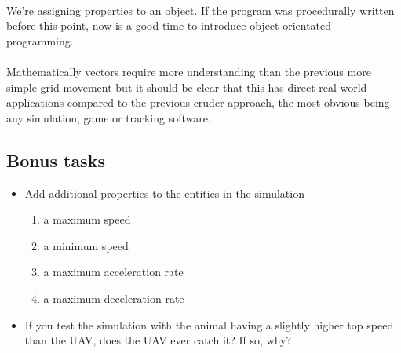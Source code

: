 \documentclass[11pt]{book}
\begin{document}
\paragraph{} We're assigning properties to an object. If the program was
procedurally written before this point, now is a good time to introduce object
orientated programming.

\paragraph{} Mathematically vectors require more understanding than the
previous more simple grid movement but it should be clear that this has direct
real world applications compared to the previous cruder approach, the most
obvious being any simulation, game or tracking software.

\subsection{Bonus tasks}

\begin{itemize}
\item Add additional properties to the entities in the simulation
    \begin{enumerate} 
    \item a maximum speed
    \item a minimum speed
    \item a maximum acceleration rate
    \item a maximum deceleration rate
    \end{enumerate}
\item If you test the simulation with the animal having a slightly higher top speed than the UAV, does the UAV ever catch it? If so, why?
\end{itemize}

\clearpage
\end{document}
